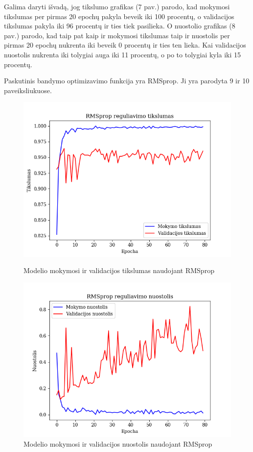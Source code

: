 \documentclass{VUMIFPSkursinis}
\begin{document}
Galima daryti išvadą, jog tikslumo grafikas (7 pav.) parodo, kad mokymosi tikslumas per pirmas 20 epochų pakyla beveik iki 100 procentų, o validacijos tikslumas pakyla iki 96 procentų ir ties tiek pasilieka.
O nuostolio grafikas (8 pav.) parodo, kad taip pat kaip ir mokymosi tikslumas taip ir nuostolis per pirmas 20 epochų nukrenta iki beveik 0 procentų ir ties ten lieka. Kai validacijos nuostolis 
nukrenta iki tolygiai auga iki 11 procentų, o po to tolygiai kyla iki 15 procentų.

Paskutinis bandymo optimizavimo funkcija yra RMSprop. Ji yra parodyta 9 ir 10 paveiksliukuose.

\begin{figure}[!htbp]
  \centering
  \begin{minipage}[b]{0.49\textwidth}
    \includegraphics[width=\textwidth]{img/FT/RMSprop_acc.png}
    \caption{Modelio mokymosi ir validacijos tikslumas naudojant RMSprop}
  \end{minipage}
  \begin{minipage}[b]{0.49\textwidth}
    \includegraphics[width=\textwidth]{img/FT/RMSprop_loss.png}
    \caption{Modelio mokymosi ir validacijos nuostolis naudojant RMSprop}
  \end{minipage}
\end{figure}
\end{document}
